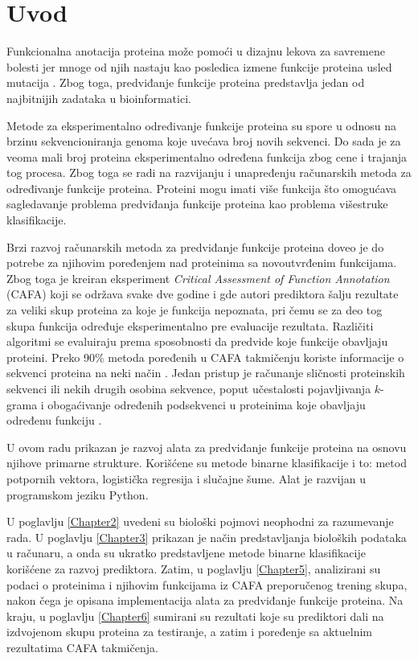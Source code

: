 \chapter{Uvod} %
\label{Chapter1}

Funkcionalna anotacija proteina može pomoći u dizajnu lekova za savremene bolesti jer mnoge od njih nastaju kao posledica izmene funkcije proteina usled mutacija \cite{review}. Zbog toga, predviđanje funkcije proteina predstavlja jedan od najbitnijih zadataka u bioinformatici. 

Metode za eksperimentalno određivanje funkcije proteina su spore u odnosu na brzinu sekvencioniranja genoma koje uvećava broj novih sekvenci. Do sada je za veoma mali broj proteina eksperimentalno određena funkcija zbog cene i trajanja tog procesa. Zbog toga se radi na razvijanju i unapređenju računarskih metoda za određivanje funkcije proteina. Proteini mogu imati više funkcija što omogućava sagledavanje problema predviđanja funkcije proteina kao problema višestruke klasifikacije.

Brzi razvoj računarskih metoda za predviđanje funkcije proteina doveo je do potrebe za njihovim poređenjem nad proteinima sa novoutvrđenim funkcijama. Zbog toga je kreiran eksperiment \textit{Critical Assessment of Function Annotation} (CAFA) \cite{biofCafa} koji se održava svake dve godine i gde autori prediktora šalju rezultate za veliki skup proteina za koje je funkcija nepoznata, pri čemu se za deo tog skupa funkcija određuje eksperimentalno pre evaluacije rezultata. Različiti algoritmi se evaluiraju prema sposobnosti da predvide koje funkcije obavljaju proteini. Preko 90\% metoda poređenih u CAFA takmičenju koriste informacije o sekvenci proteina na neki način \cite{jiang}. Jedan pristup je računanje sličnosti proteinskih sekvenci \cite{cozzeto, gong, lan} ili nekih drugih osobina sekvence, poput učestalosti pojavljivanja $k$-grama \cite{cozzeto} i obogaćivanje određenih podsekvenci u proteinima koje obavljaju određenu funkciju \cite{caoCheng}.

U ovom radu prikazan je razvoj alata za predviđanje funkcije proteina na osnovu njihove primarne strukture. Korišćene su metode binarne klasifikacije i to: metod potpornih vektora, logistička regresija i slučajne šume. Alat je razvijan u programskom jeziku Python. 

U poglavlju \ref{Chapter2} uvedeni su biološki pojmovi neophodni za razumevanje rada. U poglavlju \ref{Chapter3} prikazan je način predstavljanja bioloških podataka u računaru, a onda su ukratko predstavljene metode binarne klasifikacije korišćene za razvoj prediktora. Zatim, u poglavlju \ref{Chapter5}, analizirani su podaci o proteinima i njihovim funkcijama iz CAFA preporučenog trening skupa, nakon čega je opisana  implementacija alata za predviđanje funkcije proteina. Na kraju, u poglavlju \ref{Chapter6} sumirani su rezultati koje su prediktori dali na izdvojenom skupu proteina za testiranje, a zatim i poređenje sa aktuelnim rezultatima CAFA takmičenja.